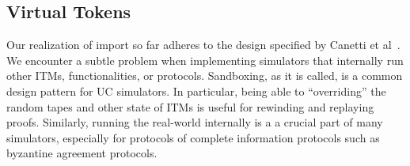 %
%
%
%
%

\subsection{Virtual Tokens}
Our realization of import so far adheres to the design specified by Canetti et al~\cite{uc}.
We encounter a subtle problem when implementing simulators that internally run other ITMs, functionalities, or protocols.
Sandboxing, as it is called, is a common design pattern for UC simulators. 
In particular, being able to ``overriding'' the random tapes and other state of ITMs is useful for rewinding and replaying proofs.
Similarly, running the real-world internally is a a crucial part of many simulators, especially for protocols of complete information protocols such as byzantine agreement protocols.

